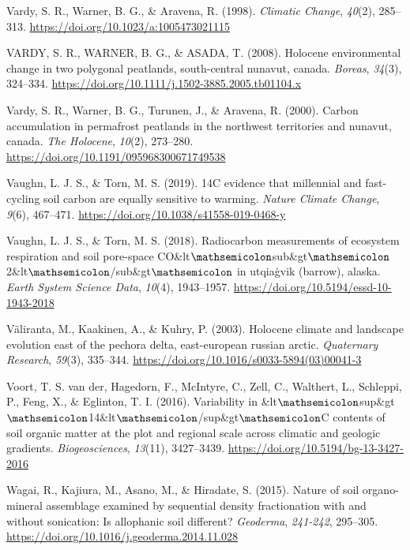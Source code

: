 \documentclass[]{article}
\begin{document}
\leavevmode\hypertarget{ref-Vardy_1998}{}%
Vardy, S. R., Warner, B. G., \& Aravena, R. (1998). \emph{Climatic
Change}, \emph{40}(2), 285--313.
\url{https://doi.org/10.1023/a:1005473021115}

\leavevmode\hypertarget{ref-VARDY_2008}{}%
VARDY, S. R., WARNER, B. G., \& ASADA, T. (2008). Holocene environmental
change in two polygonal peatlands, south-central nunavut, canada.
\emph{Boreas}, \emph{34}(3), 324--334.
\url{https://doi.org/10.1111/j.1502-3885.2005.tb01104.x}

\leavevmode\hypertarget{ref-Vardy_2000}{}%
Vardy, S. R., Warner, B. G., Turunen, J., \& Aravena, R. (2000). Carbon
accumulation in permafrost peatlands in the northwest territories and
nunavut, canada. \emph{The Holocene}, \emph{10}(2), 273--280.
\url{https://doi.org/10.1191/095968300671749538}

\leavevmode\hypertarget{ref-Vaughn_2019}{}%
Vaughn, L. J. S., \& Torn, M. S. (2019). 14C evidence that millennial
and fast-cycling soil carbon are equally sensitive to warming.
\emph{Nature Climate Change}, \emph{9}(6), 467--471.
\url{https://doi.org/10.1038/s41558-019-0468-y}

\leavevmode\hypertarget{ref-Vaughn_2018}{}%
Vaughn, L. J. S., \& Torn, M. S. (2018). Radiocarbon measurements of
ecosystem respiration and soil pore-space
CO\&lt\(\mathsemicolon\)sub\&gt\(\mathsemicolon\)2\&lt\(\mathsemicolon\)/sub\&gt\(\mathsemicolon\)
in utqiaġvik (barrow), alaska. \emph{Earth System Science Data},
\emph{10}(4), 1943--1957.
\url{https://doi.org/10.5194/essd-10-1943-2018}

\leavevmode\hypertarget{ref-V_liranta_2003}{}%
Väliranta, M., Kaakinen, A., \& Kuhry, P. (2003). Holocene climate and
landscape evolution east of the pechora delta, east-european russian
arctic. \emph{Quaternary Research}, \emph{59}(3), 335--344.
\url{https://doi.org/10.1016/s0033-5894(03)00041-3}

\leavevmode\hypertarget{ref-van_der_Voort_2016}{}%
Voort, T. S. van der, Hagedorn, F., McIntyre, C., Zell, C., Walthert,
L., Schleppi, P., Feng, X., \& Eglinton, T. I. (2016). Variability in
\&lt\(\mathsemicolon\)sup\&gt\(\mathsemicolon\)14\&lt\(\mathsemicolon\)/sup\&gt\(\mathsemicolon\)C
contents of soil organic matter at the plot and regional scale across
climatic and geologic gradients. \emph{Biogeosciences}, \emph{13}(11),
3427--3439. \url{https://doi.org/10.5194/bg-13-3427-2016}

\leavevmode\hypertarget{ref-Wagai_2015}{}%
Wagai, R., Kajiura, M., Asano, M., \& Hiradate, S. (2015). Nature of
soil organo-mineral assemblage examined by sequential density
fractionation with and without sonication: Is allophanic soil different?
\emph{Geoderma}, \emph{241-242}, 295--305.
\url{https://doi.org/10.1016/j.geoderma.2014.11.028}
\end{document}
